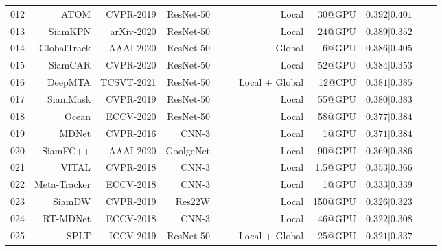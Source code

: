 \documentclass[final]{cvpr}
\begin{document}
\begin{table*}[!htp]
\begin{tabular}{rrrrccrrccc}
012			&ATOM		 	 \cite{danelljan2019atom}					&CVPR-2019    	&ResNet-50     	&\xmark     			&\cmark    	&Local    		 		&30@GPU    	&$0.392|0.401$		 	\\
013			&SiamKPN		 \cite{li2020siamKPN}							&arXiv-2020    	&ResNet-50     	&\xmark     			&\cmark    	&Local    		 		&24@GPU    	&$0.389|0.352$		 	\\
014			&GlobalTrack	 \cite{huang2019globaltrack}				&AAAI-2020    	&ResNet-50     	&\xmark     			&\cmark    	&Global    		 	&6@GPU    	 	&$0.386|0.405$		 	\\
015			&SiamCAR		 \cite{guo2020siamcar}						&CVPR-2020    	&ResNet-50     	&\xmark     			&\cmark    	&Local    		 		&52@GPU    	&$0.384|0.353$		 	\\
016			&DeepMTA		\cite{deepMTA}									&TCSVT-2021    	&ResNet-50     	&\cmark     			&\cmark    	&Local + Global    	&12@CPU   				&$0.381|0.385$		 	\\
017			&SiamMask	 	 \cite{wang2019fast}							&CVPR-2019    	&ResNet-50     	&\xmark     			&\cmark    	&Local    		 		&55@GPU    	 			&$0.380|0.383$		 	\\
018			&Ocean		 	  \cite{zhang2020ocean}						&ECCV-2020    	&ResNet-50     	&\xmark     			&\cmark    	&Local    		 		&58@GPU    	 			&$0.377|0.384$		 	\\
019			&MDNet		 	  \cite{Nam2015Learning}					&CVPR-2016    	&CNN-3     			&\cmark     			&\cmark    	&Local    		 		&1@GPU    	 				&$0.371|0.384$		 	\\
020			&SiamFC++	  	  \cite{xu2020siamfc++}						&AAAI-2020    	&GoolgeNet     	&\cmark     			&\cmark    	&Local    		 		&90@GPU    	 			&$0.369|0.386$		 	\\
021			&VITAL			  \cite{SongYiBing_2018_CVPR}			&CVPR-2018    	&CNN-3     			&\cmark     			&\cmark    	&Local    		 		&1.5@GPU    	 			&$0.353|0.366$		 	\\
022			&Meta-Tracker \cite{Park_2018_ECCV}						&ECCV-2018   	&CNN-3     			&\cmark     			&\cmark    	&Local    		 		&1@GPU    	 				&$0.333|0.339$		 	\\
023			&SiamDW		 \cite{zhipeng2019deeper}					&CVPR-2019    	&Res22W     		&\xmark     			&\cmark    	&Local    		 		&150@GPU   	 			&$0.326|0.323$		 	\\
024			&RT-MDNet	 	\cite{Jung_2018_ECCV}						&ECCV-2018    	&CNN-3     			&\cmark     			&\cmark    	&Local    		 		&46@GPU    	 			&$0.322|0.308$		 	\\
025			&SPLT			 	\cite{yan2019skimming}						&ICCV-2019    	&ResNet-50     	&\xmark     			&\cmark    	&Local + Global  &25@GPU    	 			&$0.321|0.337$		 	\\

\end{tabular}
\end{table*}
\end{document}
